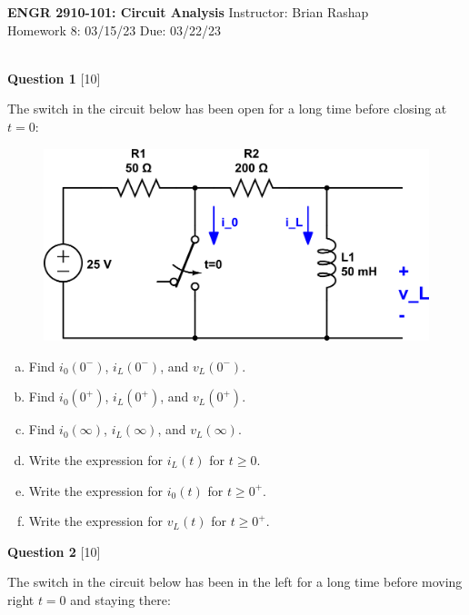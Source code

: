 \documentclass[12pt]{article}
\begin{document}
\begin{center}
\hfil
{\large\bf {ENGR 2910-101: Circuit Analysis}}
\hfill Instructor: Brian Rashap\\
Homework 8: 03/15/23 \hfill Due: 03/22/23\\
\hrulefill\\
\end{center}

{\bf Question 1} [10] %

The switch in the circuit below has been open for a long time before closing at $t=0$:

\begin{figure}[h!]
\begin{center}
 \includegraphics[scale=0.4]{p7_4.png}
\end{center}
\end{figure}

\begin{enumerate}[(a)]
\item Find $i_0(0^-)$, $i_L(0^-)$, and $v_L(0^-)$.
\item Find $i_0(0^+)$, $i_L(0^+)$, and $v_L(0^+)$.
\item Find $i_0(\infty)$, $i_L(\infty)$, and $v_L(\infty)$.
\item Write the expression for $i_L(t)$ for $t \geq 0$.
\item Write the expression for $i_0(t)$ for $t \geq 0^+$.
\item Write the expression for $v_L(t)$ for $t \geq 0^+$.
\end{enumerate}


\vspace{0.1in}


{\bf Question 2} [10] %

The switch in the circuit below has been in the left for a long time before moving right $t=0$ and staying there:
\end{document}
